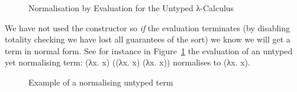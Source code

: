 \begin{figure}[h]
\caption{Normalisation by Evaluation for the Untyped λ-Calculus}
\end{figure}

We have not used the  constructor so \emph{if} the evaluation terminates
(by disabling totality checking we have lost all guarantees of the sort) we know
we will get a term in normal form. See for instance in
Figure~\ref{fig:normuntyped} the evaluation of an untyped yet normalising
term: {(λx. x) ((λx. x) (λx. x))} normalises to {(λx. x)}.

\begin{figure}[h]
\caption{Example of a normalising untyped term}
\label{fig:normuntyped}
\end{figure}
